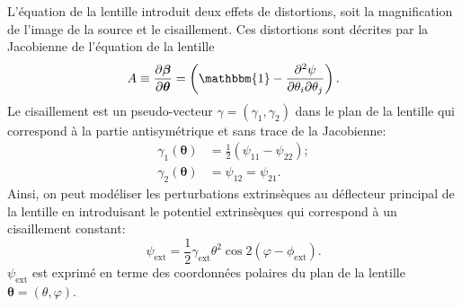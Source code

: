 \documentclass[times,10pt,twocolumn]{article}
\begin{document}
L'équation de la lentille introduit deux effets de distortions, soit la magnification de l'image 
de la source et le cisaillement. Ces distortions sont décrites par la Jacobienne de 
l'équation de la lentille
\begin{equation}\label{eq:Jacobian} 
        A \equiv \frac{\partial \boldsymbol{\beta}}{\partial \boldsymbol{\theta}}
= \left( \mathbbm{1} - \frac{\partial^2 \psi}{\partial \theta_i \partial \theta_j} \right). 
\end{equation} 
Le cisaillement est un pseudo-vecteur $\gamma = (\gamma_1, \gamma_2)$ dans le plan de la lentille 
qui correspond à la partie antisymétrique et sans trace de la Jacobienne:
\begin{align}
        \gamma_1(\boldsymbol{\theta}) &=  \frac{1}{2} \left( \psi_{11} - \psi_{22} \right); \\
        \gamma_2(\boldsymbol{\theta}) &= \psi_{12} = \psi_{21}.
\end{align}
Ainsi, on peut modéliser les perturbations extrinsèques au déflecteur principal de la lentille 
en introduisant le potentiel extrinsèques qui correspond à un 
cisaillement constant:
\begin{equation}\label{eq:gamma_ext} 
        \psi_{\mathrm{ext}}  = \frac{1}{2} \gamma_{\mathrm{ext}} \theta^2 
        \cos 2(\varphi - \phi_{\mathrm{ext}}).
\end{equation} 
$\psi_{\mathrm{ext}}$ est exprimé en terme des coordonnées polaires du plan de la lentille 
$\boldsymbol{\theta} = (\theta, \varphi)$.

\end{document}
